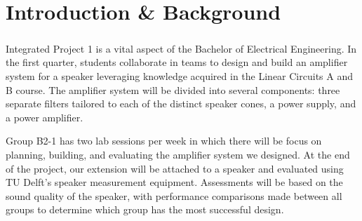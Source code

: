 
\chapter{Introduction \& Background }
\setlength{\parindent}{20pt}

\paragraph{}
Integrated Project 1 is a vital aspect of the Bachelor of Electrical Engineering. In the first quarter, students collaborate in teams to design and build an amplifier system for a speaker leveraging knowledge acquired in the Linear Circuits A and B course. The amplifier system will be divided into several components: three separate filters tailored to each of the distinct speaker cones, a power supply, and a power amplifier.

Group B2-1 has two lab sessions per week in which there will be focus on planning, building, and evaluating the amplifier system we designed. At the end of the project, our extension will be attached to a speaker and evaluated using TU Delft's speaker measurement equipment. Assessments will be based on the sound quality of the speaker, with performance comparisons made between all groups to determine which group has the most successful design.
